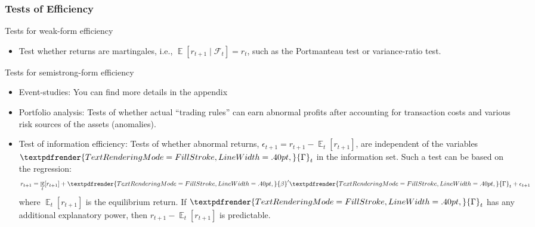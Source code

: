\documentclass[xcolor=dvipsnames, english, 8pt]{beamer}
\DeclareMathOperator{\E}{\mathbb{E}}
\newcommand*{\boldgreek}[1]{%
  \textpdfrender{%
    TextRenderingMode=FillStroke,%
    LineWidth=.40pt,%
  }{#1}%
}
\begin{document}
\begin{frame}
    \frametitle{Tests of Efficiency}
    Tests for weak-form efficiency \vspace{0.25cm}\\
    \begin{itemize}
        \item Test whether returns are martingales, i.e., $\E[r_{t+1} \mid \mathscr{F}_{t}] = r_t$, such as the {\color{ubRed} Portmanteau test} or {\color{ubRed} variance-ratio test}.\vspace {0.25cm}\\
    \end{itemize}
    Tests for semistrong-form efficiency \vspace{0.25cm}\\
    \begin{itemize}
        \item  {\color{ubRed} Event-studies}:  You can find more details in the appendix \hyperlink{Event_studies}{}

        \item {\color{ubRed} Portfolio analysis}: Tests of whether actual “trading rules” can earn abnormal profits after accounting for transaction costs and various risk sources of the assets ({\color{ubRed}anomalies}).
        \item {\color{ubRed} Test of
        information efficiency}: Tests of whether abnormal returns, $\epsilon_{t+1} = r_{t+1} - \E_t[r_{t+1}]$, are independent of the
variables $\boldgreek{\Gamma}_t$ in the information set. Such a test can be based on the regression:
\begin{align}
    r_{t+1} = \E_t[r_{t+1}] + \boldgreek{\beta}'\boldgreek{\Gamma}_t + \epsilon_{t+1}
\end{align}
where $\E_t[r_{t+1}]$ is the equilibrium return. If $\boldgreek{\Gamma}_t$ has any additional explanatory power,
then $ r_{t+1} - \E_t[r_{t+1}]$ is predictable.



    \end{itemize}
\end{frame}
\end{document}
